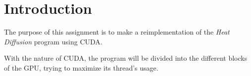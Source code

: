 \documentclass[../main.tex]{subfiles}
\begin{document}
\section{Introduction}

The purpose of this assignment is to make a reimplementation of the \textit{Heat Diffusion} program using CUDA.

With the nature of CUDA, the program will be divided into the different blocks of the GPU, trying to maximize its thread's usage.
\end{document}
